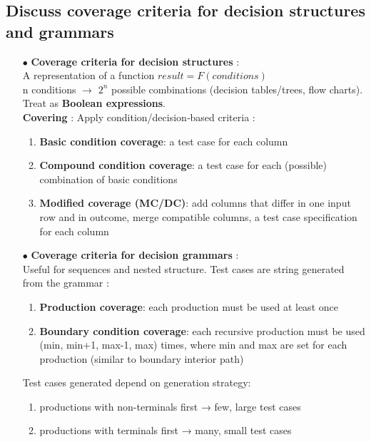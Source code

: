\documentclass{article}
\begin{document}
\subsection{Discuss coverage criteria for decision structures and grammars}
\begin{itemize}
        \item [$\bullet$]\textbf{Coverage criteria for decision structures }: \\
        A representation of a function $result = F(conditions)$\\
        n conditions $\rightarrow$ $2^n$ possible combinations (decision tables/trees, flow charts).\\
        Treat as \textbf{Boolean expressions}.\\
        \textbf{Covering} : Apply condition/decision‐based criteria : 
        \begin{enumerate}
            \item \textbf{Basic condition coverage}: a test case for each column
            \item \textbf{Compound condition coverage}: a test case for each (possible) combination of basic conditions
            \item \textbf{Modified coverage (MC/DC)}: add columns that differ in one input row and in outcome, merge compatible columns, a test case specification for each column \\
        \end{enumerate}
        
        \item [$\bullet$]\textbf{Coverage criteria for decision grammars }: \\
        Useful for sequences and nested structure. Test cases are string generated from the grammar : 
        \begin{enumerate}
            \item \textbf{Production coverage}: each production must be used at least once
            \item \textbf{Boundary condition coverage}: each recursive production must be used (min, min+1, max-1, max) times, where min and max are set for each production (similar to boundary interior path)
        \end{enumerate}
        Test cases generated depend on generation strategy:
        \begin{enumerate}
            \item productions with non-terminals first → few, large test cases
            \item productions with terminals first → many, small test cases

        \end{enumerate}
\end{itemize}
\end{document}
